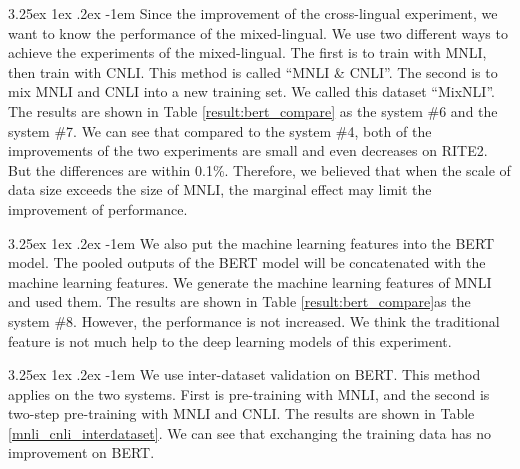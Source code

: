 \documentclass[12pt]{article}
\makeatletter
\renewcommand\paragraph{\@startsection{paragraph}{5}{\z@}%
  {3.25ex \@plus1ex \@minus.2ex}%
  {-1em}%
  {\normalfont\normalsize\bfseries}}
\makeatother
\begin{document}
\begin{CJK*}{UTF8}{bkai}
\begin{spacing}{1.77}
\paragraph{}
Since the improvement of the cross-lingual experiment, we want to know the performance of the mixed-lingual. We use two different ways to achieve the experiments of the mixed-lingual. The first is to train with MNLI, then train with CNLI. This method is called ``MNLI \& CNLI''. The second is to mix MNLI and CNLI into a new training set. We called this dataset ``MixNLI''. The results are shown in Table \ref{result:bert_compare} as the system \#6 and the system \#7. We can see that compared to the system \#4, both of the improvements of the two experiments are small and even decreases on RITE2. But the differences are within 0.1\%. Therefore, we believed that when the scale of data size exceeds the size of MNLI, the marginal effect may limit the improvement of performance.

\paragraph{}
We also put the machine learning features into the BERT model. The pooled outputs of the BERT model will be concatenated with the machine learning features. We generate the machine learning features of MNLI and used them. The results are shown in Table \ref{result:bert_compare}as the system \#8. However, the performance is not increased. We think the traditional feature is not much help to the deep learning models of this experiment.

\paragraph{}
We use inter-dataset validation on BERT. This method applies on the two systems. First is pre-training with MNLI, and the second is two-step pre-training with MNLI and CNLI. The results are shown in Table \ref{mnli_cnli_interdataset}. We can see that exchanging the training data has no improvement on BERT.


\end{spacing}
\end{CJK*}
\end{document}
